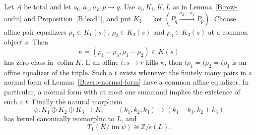 \begin{proposition}\label{B:lead5}
Let $A$ be total and let $a_0,a_1,a_2:p\to q$.
Use $z_i,K_i,K,L$ as in Lemma~\ref{B:row-audit} and
Proposition~\ref{B:lead1}, and put
$K_3=\ker(P_q\xrightarrow{a_2-a_1}P_p)$.
Choose affine pair equalizers $\rho_1\in K_1(s)$,
$\rho_2\in K_2(s)$ and $\rho_3\in K_3(s)$ at a common object $s$.
Then
\[
 \kappa=(\rho_1-\rho_3,\rho_3-\rho_2)\in K(s)
\]
has zero class in $\operatorname{colim}K$.
If an affine $t:s\to r$ kills $\kappa$, then
$t\rho_1=t\rho_2=t\rho_3$ is an affine equalizer of the triple.
Such a $t$ exists whenever the finitely many pairs in a normal form of
Lemma~\ref{B:zero-normal-form} have a common affine equalizer.
In particular, a normal form with at most one summand implies the
existence of such a $t$.
Finally the natural morphism
\[
 \psi:K_1\oplus K_2\oplus K_3\longrightarrow K,
 \qquad(k_1,k_2,k_3)\longmapsto(k_1-k_3,k_2+k_3)
\]
has kernel canonically isomorphic to $L$, and
\[
 T_1(K/\operatorname{im}\psi)\cong\mathbb Z/\epsilon(L).
\]
\end{proposition}
